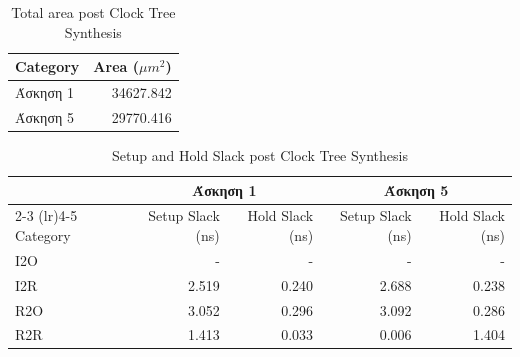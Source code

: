\begin{table}[H]
    \centering
    \caption{Power Consumption per Category pre Clock Tree Synthesis}
\end{table}

\begin{table}[H]
    \centering
    \caption{Total area post Clock Tree Synthesis}
    \begin{tabular}{lr}
        \toprule
        Category & Area ($\mu m^2$) \\
        \midrule
        Άσκηση 1 & 34627.842 \\
        Άσκηση 5 & 29770.416 \\
        \bottomrule
    \end{tabular}
\end{table}

\begin{table}[H]
    \centering
    \caption{Setup and Hold Slack post Clock Tree Synthesis}
    \begin{tabular}{lrrrr}
        \toprule
         & \multicolumn{2}{c}{\textbf{Άσκηση 1}} & \multicolumn{2}{c}{\textbf{Άσκηση 5}} \\
        \cmidrule(lr){2-3} \cmidrule(lr){4-5}
        Category & Setup Slack (ns) & Hold Slack (ns) & Setup Slack (ns) & Hold Slack (ns) \\
        \midrule
        I2O & - & - & - & - \\
        I2R & 2.519 & 0.240 & 2.688 & 0.238 \\
        R2O & 3.052 & 0.296 & 3.092 & 0.286 \\
        R2R & 1.413 & 0.033 & 0.006 & 1.404 \\
        \bottomrule
    \end{tabular}
\end{table}

